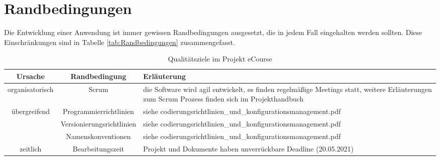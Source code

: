 
\chapter{Randbedingungen}
Die Entwicklung einer Anwendung ist immer gewissen Randbedingungen ausgesetzt, die in jedem Fall eingehalten werden sollten. Diese Einschränkungen sind in Tabelle \ref{tab:Randbedingungen} zusammengefasst. 

\begin{table}
\centering
\begin{tabularx}{\textwidth}[H]{|c|c|X|}
\hline
Ursache & Randbedingung & Erläuterung\\
\hline
organisatorisch & Scrum & die Software wird agil entwickelt, es finden regelmäßige Meetings statt, weitere Erläuterungen zum Scrum Prozess finden sich im Projekthandbuch \\
\hline
übergreifend & Programmierrichtlinien & siehe codierungsrichtlinien\_und\_konfigurationsmanagement.pdf \\
\hline
\quad & Versionierungsrichtlinien & siehe codierungsrichtlinien\_und\_konfigurationsmanagement.pdf \\
\hline
\quad & Namenskonventionen & siehe codierungsrichtlinien\_und\_konfigurationsmanagement.pdf \\
\hline
zeitlich & Bearbeitungszeit & Projekt und Dokumente haben unverrückbare Deadline (20.05.2021)\\
\hline
\end{tabularx}
\caption{Qualitätsziele im Projekt eCourse}
\label{tab:Qualitätsziele}
\end{table}
